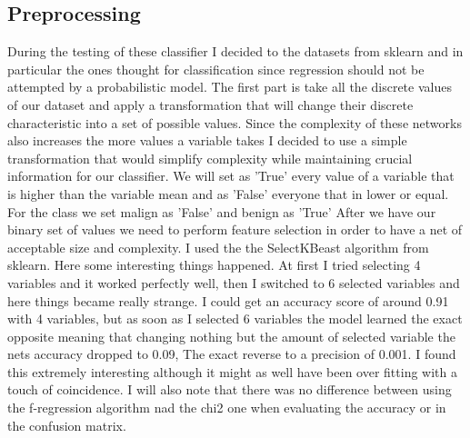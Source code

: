 \documentclass{article} %
\begin{document}
\subsection{Preprocessing}
  During the testing of these classifier I decided to the datasets from sklearn and in particular the ones thought for classification since regression should not be attempted by a probabilistic model.
\bigskip
The first part is take all the discrete values of our dataset and apply a transformation that will change their discrete characteristic into a set of possible values. Since the complexity of these networks also increases the more values a variable takes I decided to use a simple transformation that would simplify complexity while maintaining crucial information for our classifier. 
\smallskip
We will set as 'True' every value of a variable that is higher than the variable mean and as 'False' everyone that in lower or equal. For the class we set malign as 'False' and benign as 'True'
\smallskip
After we have our binary set of values we need to perform feature selection in order to have a net of acceptable size and complexity. I used the the SelectKBeast algorithm from sklearn. Here some interesting things happened.
\smallskip
At first I tried selecting 4 variables and it worked perfectly well, then I switched to 6 selected variables and here things became really strange. I could get an accuracy score of around 0.91 with 4 variables, but as soon as I selected 6 variables the model learned the exact opposite meaning that changing nothing but the amount of selected variable the nets accuracy dropped to 0.09, The exact reverse to a precision of 0.001. I found this extremely interesting although it might as well have been over fitting with a touch of coincidence.  
\smallskip
I will also note that there was no difference between using the f-regression algorithm nad the chi2 one when evaluating the accuracy or in the confusion matrix.
\end{document}
